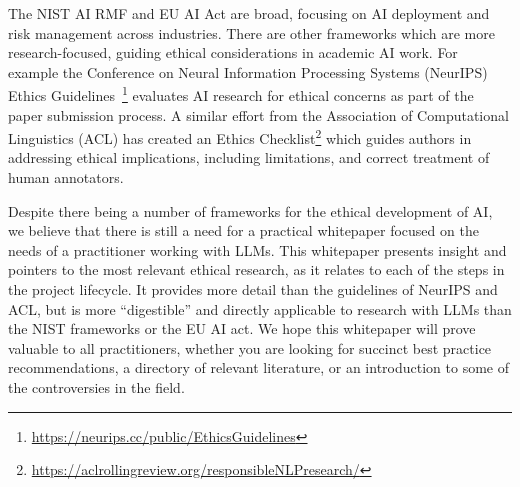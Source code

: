 The NIST AI RMF and EU AI Act are broad, focusing on AI deployment and risk management across industries. There are other frameworks which are more research-focused, guiding ethical considerations in academic AI work. For example the Conference on Neural Information Processing Systems (NeurIPS) Ethics Guidelines~\footnote{\url{https://neurips.cc/public/EthicsGuidelines}} evaluates AI research for ethical concerns as part of the paper submission process.
A similar effort from the Association of Computational Linguistics (ACL) has created an Ethics Checklist\footnote{\url{https://aclrollingreview.org/responsibleNLPresearch/}} which guides authors in addressing ethical implications, including limitations, and correct treatment of human annotators.

Despite there being a number of frameworks for the ethical development of AI, we believe that there is still a need for a practical whitepaper focused on the needs of a practitioner working with LLMs. This whitepaper presents insight and pointers to the most relevant ethical research, as it relates to each of the steps in the project lifecycle. It provides more detail than the guidelines of NeurIPS and ACL, but is more ``digestible'' and directly applicable to research with LLMs than the NIST frameworks or the EU AI act. We hope this whitepaper will prove valuable to all practitioners, whether you are looking for succinct best practice recommendations, a directory of relevant literature, or an introduction to some of the controversies in the field. 







